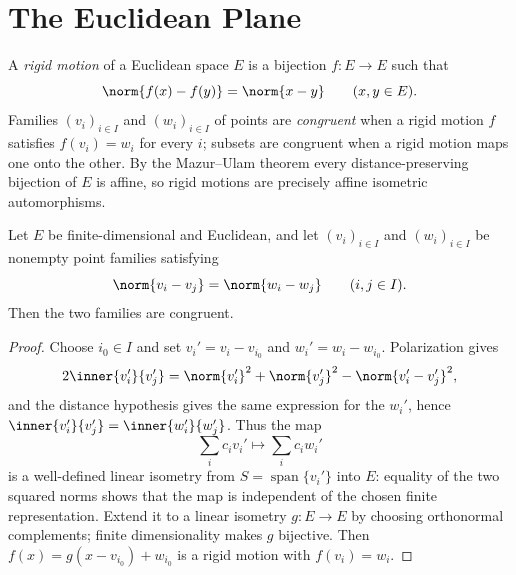 
\section{The Euclidean Plane}

\begin{definition}
\label{def:rigid-motion}
\mathlibok
A \emph{rigid motion} of a Euclidean space $E$ is a bijection $f\colon E\to E$ such that
\[
\norm{f(x)-f(y)}=\norm{x-y}\qquad (x,y\in E).
\]
Families $(v_i)_{i\in I}$ and $(w_i)_{i\in I}$ of points are \emph{congruent} when a rigid motion
$f$ satisfies $f(v_i)=w_i$ for every $i$; subsets are congruent when a rigid motion maps one onto
the other. By the Mazur--Ulam theorem every distance-preserving bijection of $E$ is affine, so rigid
motions are precisely affine isometric automorphisms.
\end{definition}

\begin{lemma}
\label{lem:isometry-extension}
\leanok
Let $E$ be finite-dimensional and Euclidean, and let $(v_i)_{i\in I}$ and $(w_i)_{i\in I}$ be
nonempty point families satisfying
\[
\norm{v_i-v_j}=\norm{w_i-w_j}\qquad (i,j\in I).
\]
Then the two families are congruent.
\end{lemma}
\begin{proof}
\sketch Choose $i_0\in I$ and set $v_i'=v_i-v_{i_0}$ and $w_i'=w_i-w_{i_0}$. Polarization gives
\[
2\inner{v_i'}{v_j'}=\norm{v_i'}^2+\norm{v_j'}^2-\norm{v_i'-v_j'}^2,
\]
and the distance hypothesis gives the same expression for the $w_i'$, hence
$\inner{v_i'}{v_j'}=\inner{w_i'}{w_j'}$. Thus the map
\[
\sum_i c_i v_i'\longmapsto\sum_i c_i w_i'
\]
is a well-defined linear isometry from $S=\operatorname{span}\{v_i'\}$ into $E$: equality of the
two squared norms shows that the map is independent of the chosen finite representation. Extend it
to a linear isometry $g\colon E\to E$ by choosing orthonormal complements; finite dimensionality
makes $g$ bijective. Then $f(x)=g(x-v_{i_0})+w_{i_0}$ is a rigid motion with $f(v_i)=w_i$.
\end{proof}

